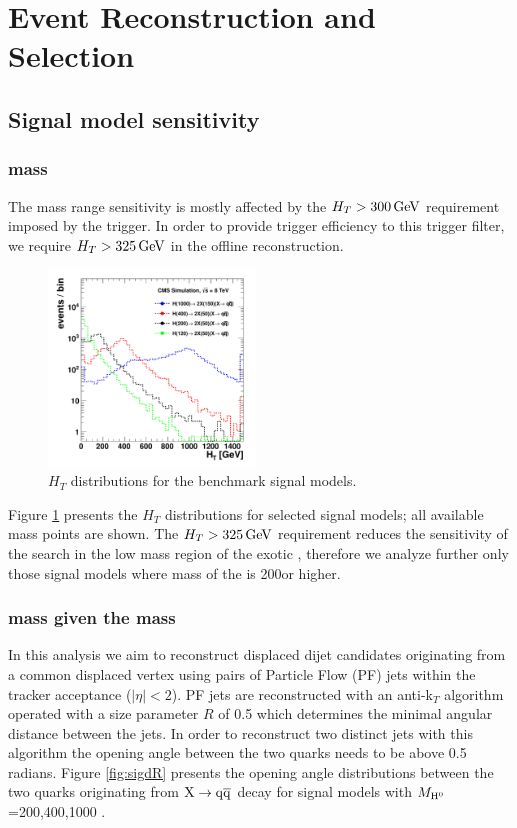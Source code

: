 \section{Event Reconstruction and Selection}

\subsection{Signal model sensitivity}
\label{subsec:sigsensitivity}

\subsubsection{\Higgs mass}

The \Higgs mass range sensitivity is mostly affected by the $H_T>300\,\text{Ge\hspace{-.08em}V}$ requirement imposed by the trigger. 
In order to provide trigger efficiency to this trigger filter,
we require $H_T>325\,\text{Ge\hspace{-.08em}V}$ in the offline reconstruction.

\begin{figure}[htbp]
\centering
\includegraphics[width=0.49\textwidth]{plots/signal/ht.pdf}
\caption{$H_T$ distributions for the benchmark signal models.\label{fig:sight}}
\end{figure}

Figure \ref{fig:sight} presents the $H_T$ distributions for selected signal models; all available \Higgs 
mass points are shown.
The $H_T>325\,\text{Ge\hspace{-.08em}V}$ requirement reduces the sensitivity of the search in the low mass region of the exotic \Higgs,
therefore we analyze further only those signal models where mass of the \Higgs is 200\GeV or higher.

\subsubsection{\X mass given the \Higgs mass}

In this analysis we aim to reconstruct displaced dijet candidates originating from a common displaced
vertex using pairs of 
Particle Flow (PF) jets \cite{CMS-PAS-PFT-09-001} within the tracker acceptance ($|\eta|<2$).  
 PF jets are reconstructed with an anti-k$_T$
algorithm operated with a size parameter $R$ of 0.5 \cite{Cacciari:2008gp} which determines
the minimal angular distance between the jets. In order to reconstruct two distinct
jets with this algorithm the opening angle between the two quarks needs to be above 0.5 radians.
Figure \ref{fig:sigdR} presents the opening angle distributions between the two quarks originating
from $\X \to \qq $ decay for signal models with 
$M_{\mathrm{H}^{0}}$=200,400,1000 \GeV.  

